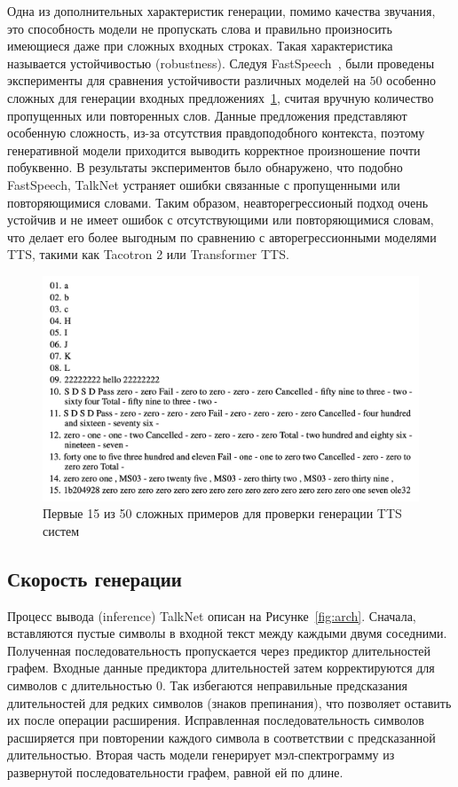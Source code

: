 Одна из дополнительных характеристик генерации, помимо качества звучания, это способность модели не пропускать слова и правильно произносить имеющиеся даже при сложных входных строках. Такая характеристика называется устойчивостью (robustness). Следуя FastSpeech~\cite{fastspeech}, были проведены эксперименты для сравнения устойчивости различных моделей на $50$ особенно сложных для генерации входных предложениях~\ref{fig:hard-examples}, считая вручную количество пропущенных или повторенных слов. Данные предложения представляют особенную сложность, из-за отсутствия правдоподобного контекста, поэтому генеративной модели приходится выводить корректное произношение почти побуквенно. В результаты экспериментов было обнаружено, что подобно FastSpeech, TalkNet устраняет ошибки связанные с пропущенными или повторяющимися словами. Таким образом, неавторегрессионый подход очень устойчив и не имеет ошибок с отсутствующими или повторяющимися словам, что делает его более выгодным по сравнению с авторегрессионными моделями TTS, такими как Tacotron 2 или Transformer TTS.

\begin{figure}[!ht]
\centering
\includegraphics[width=1.0\textwidth]{images/snippets/hard-examples.png}
\caption{Первые 15 из 50 сложных примеров для проверки генерации TTS систем}
\label{fig:hard-examples}
\end{figure}

\subsection{Скорость генерации}

Процесс вывода (inference) TalkNet описан на Рисунке~\ref{fig:arch}. Сначала, вставляются пустые символы в входной текст между каждыми двумя соседними. Полученная последовательность пропускается через предиктор длительностей графем. Входные данные предиктора длительностей затем корректируются для символов с длительностью $0$. Так избегаются неправильные предсказания длительностей для редких символов (знаков препинания), что позволяет оставить их после операции расширения. Исправленная последовательность символов расширяется при повторении каждого символа в соответствии с предсказанной длительностью. Вторая часть модели генерирует мэл-спектрограмму из развернутой последовательности графем, равной ей по длине.

